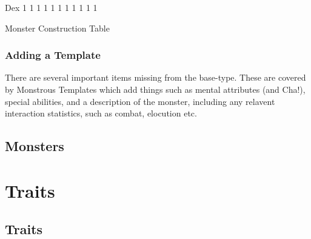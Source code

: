 \documentclass[twoside]{book}
\begin{document}
                  
                   Dex   
                   1   
                   1   
                   1   
                   1   
                   1   
                   1   
                   1   
                   1   
                   1   
                   1   
                   1   
                  
                
              Monster Construction Table  
            
\subsection{Adding a Template}
     There are several important items missing from the
               base-type. These are covered by Monstrous Templates which
               add things such as mental attributes (and Cha!), special
               abilities, and a description of the monster, including any
               relavent interaction statistics, such as combat, elocution
               etc. 
\section{Monsters}
    
\chapter{Traits}
    
\section{Traits}
    
\end{document}
